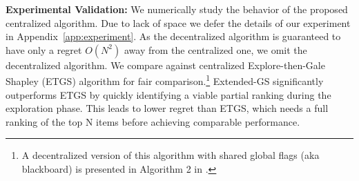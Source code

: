 \documentclass{article}
\begin{document}
\textbf{Experimental Validation:}  We numerically study the behavior of the proposed centralized algorithm. Due to lack of space we defer the details of our experiment in Appendix~\ref{app:experiment}. As the decentralized algorithm is guaranteed to have only a regret $O(N^2)$ away from the centralized one, we omit the decentralized algorithm. We compare against centralized Explore-then-Gale Shapley (ETGS) algorithm for fair comparison.\footnote{A decentralized version of this algorithm with shared global flags (aka blackboard) is presented in Algorithm 2 in \cite{tejas_2024}.} Extended-GS significantly outperforms ETGS by quickly identifying a viable partial ranking during the exploration phase. This leads to lower regret than ETGS, which needs a full ranking of the top N items before achieving comparable performance. 
\end{document}
